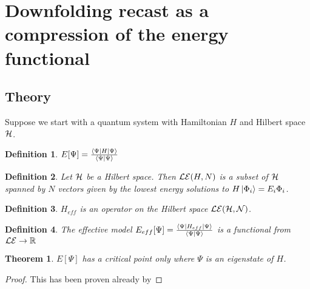 \documentclass[prl]{revtex4-1}
\newcommand{\lucas}[1]{{\color{blue}{\bf LKW: #1}}}
\newtheorem{theorem}{Theorem}
\newtheorem{definition}{Definition}
\begin{document}
\section{Downfolding recast as a compression of the energy functional}

\subsection{Theory} 

Suppose we start with a quantum system with Hamiltonian $H$ and Hilbert space ${\cal H}$.

\begin{definition}
$E[\Psi] = \frac{\bra{\Psi}H\ket{\Psi}}{\braket{\Psi|\Psi}}$
\end{definition}


\begin{definition}
Let ${\cal H}$ be a Hilbert space. Then ${\cal LE}(H,N)$ is a subset of ${\cal H}$ spanned by $N$ vectors given by the lowest energy solutions to $H\ket{\Phi_i}=E_i{\Phi_i}$. 
\end{definition}

\begin{definition}
$H_{eff}$ is an operator on the Hilbert space ${\cal LE(H,N)}$.	\lucas{Does this need to be linear?} 
\end{definition}


\begin{definition}
The effective model $E_{eff}[\Psi]=\frac{\bra{\Psi}H_{eff}\ket{\Psi}}{\braket{\Psi|\Psi}}$ is a functional from ${\cal LE} \rightarrow \mathbb{R}$
\end{definition}



\begin{theorem}
\label{theorem:criticalpoint}
$E[\Psi]$ has a critical point only where $\Psi$ is an eigenstate of $H$.
\end{theorem}
\begin{proof}
This has been proven already by \lucas{find citation} 	
\end{proof}
\end{document}
